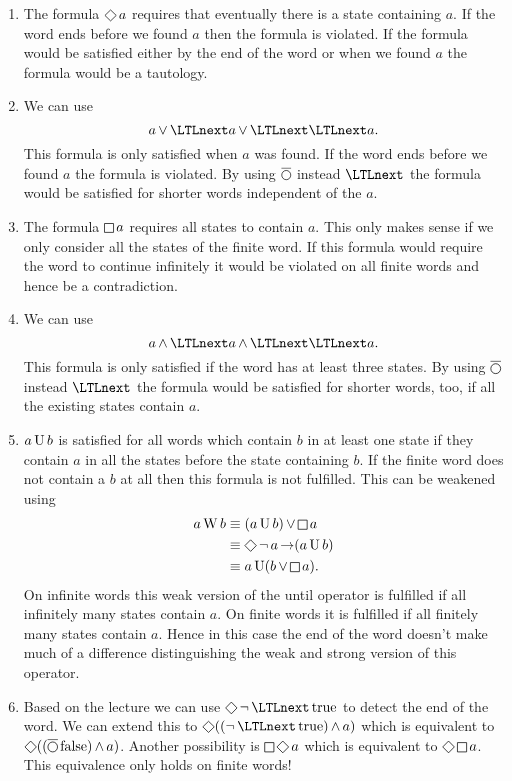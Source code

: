 \documentclass[language=en,sheet=7,prefix]{exercise}
\begin{document}
\begin{solution}
  \begin{enumerate}
    \item The formula $\LTLfinally a$ requires that eventually there is a state containing $a$. If the word ends before we found $a$ then the formula is violated. If the formula would be satisfied either by the end of the word or when we found $a$ the formula would be a tautology.
    \item We can use
      \[ a \LTLor \LTLnext a \LTLor \LTLnext \LTLnext a. \]
      This formula is only satisfied when $a$ was found. If the word ends before we found $a$ the formula is violated. By using $\LTLweaknext$ instead $\LTLnext$ the formula would be satisfied for shorter words independent of the $a$.
    \item The formula $\LTLglobally a$ requires all states to contain $a$. This only makes sense if we only consider all the states of the finite word. If this formula would require the word to continue infinitely it would be violated on all finite words and hence be a contradiction.
    \item We can use
      \[ a \LTLand \LTLnext a \LTLand \LTLnext \LTLnext a. \]
      This formula is only satisfied if the word has at least three states. By using $\LTLweaknext$ instead $\LTLnext$ the formula would be satisfied for shorter words, too, if all the existing states contain $a$.
    \item $a \operatorname{\relax{U}} b$ is satisfied for all words which contain $b$ in at least one state if they contain $a$ in all the states before the state containing $b$. If the finite word does not contain a $b$ at all then this formula is not fulfilled. This can be weakened using
    \begin{align}
      a \LTLweakuntil b &\equiv (a \LTLuntil b) \LTLor \LTLglobally a \\
      & \equiv \LTLfinally\LTLnot a \LTLimp (a \LTLuntil b) \\
      & \equiv a \LTLuntil (b \LTLor \LTLglobally a).
    \end{align}
    On infinite words this weak version of the until operator is fulfilled if all infinitely many states contain $a$. On finite words it is fulfilled if all finitely many states contain $a$. Hence in this case the end of the word doesn't make much of a difference distinguishing the weak and strong version of this operator.
    \item Based on the lecture we can use $\LTLfinally\LTLnot\LTLnext\LTLtrue$ to detect the end of the word. We can extend this to $\LTLfinally((\LTLnot\LTLnext\LTLtrue)\LTLand a)$ which is equivalent to $\LTLfinally((\LTLweaknext\LTLfalse)\LTLand a)$. Another possibility is $\LTLglobally\LTLfinally a$ which is equivalent to $\LTLfinally\LTLglobally a$. This equivalence only holds on finite words!
  \end{enumerate}
\end{solution}
\end{document}
